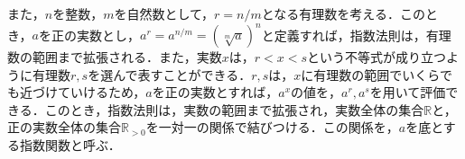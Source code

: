 また，$n$を整数，$m$を自然数として，$r = n/m$となる有理数を考える．このとき，$a$を正の実数とし，$a^r = a^{n/m} = \left(\sqrt[m]{a}\right)^n$と定義すれば，指数法則は，有理数の範囲まで拡張される\footnotemark[1]．また，実数$x$は，$r < x < s$という不等式が成り立つように有理数$r, s$を選んで表すことができる．$r, s$は，$x$に有理数の範囲でいくらでも近づけていけるため，$a$を正の実数とすれば，$a^x$の値を，$a^r, a^s$を用いて評価できる．このとき，指数法則は，実数の範囲まで拡張され，実数全体の集合$\mathbb{R}$と，正の実数全体の集合$\mathbb{R}_{>0}$を一対一の関係で結びつける\footnotemark[2]．この関係を，$a$を底とする指数関数と呼ぶ．

